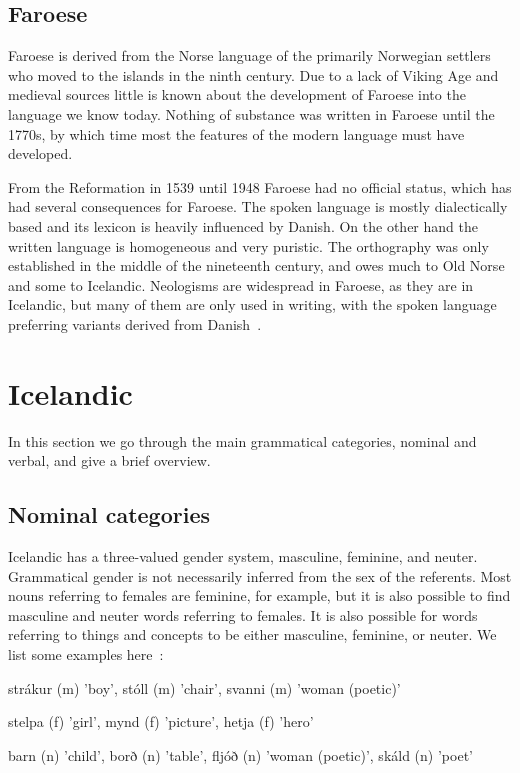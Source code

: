 \documentclass[12pt,%
    times,
]{lin-v2/lin}
\begin{document}
\subsection{Faroese}

Faroese is derived from the Norse language of the primarily Norwegian settlers
who moved to the islands in the ninth century. Due to a lack of Viking Age
and medieval sources little is known about the development of Faroese into
the language we know today. Nothing of substance was written in Faroese
until the 1770s, by which time most the features of the modern language
must have developed.

From the Reformation in 1539 until 1948 Faroese had no official status,
which has had several consequences for Faroese. The spoken language is
mostly dialectically based and its lexicon is heavily influenced by
Danish. On the other hand the written language is homogeneous and very
puristic. The orthography was only established in the middle of the nineteenth century,
and owes much to Old Norse and some to Icelandic. Neologisms are widespread
in Faroese, as they are in Icelandic, but many of them are only used in
writing, with the spoken language preferring variants derived from
Danish~\citep{germanicFaroese}.


\section{Icelandic}

In this section we go through the main grammatical categories, nominal and verbal,
and give a brief overview.

\subsection{Nominal categories}

Icelandic has a three-valued gender system, masculine, feminine, and neuter.
Grammatical gender is not necessarily inferred from the sex of the referents.
Most nouns referring to females are feminine, for example, but it is also possible to find
masculine and neuter words referring to females. It is also possible for
words referring to things and concepts to be either masculine, feminine, or neuter.
We list some examples here~\citep{icelandic}:
\begin{exe}
    \ex \begin{xlist}
        \item strákur (m) 'boy', stóll (m) 'chair', svanni (m) 'woman (poetic)'
        \item stelpa (f) 'girl', mynd (f) 'picture', hetja (f) 'hero'
        \item barn (n) 'child', borð (n) 'table', fljóð (n) 'woman (poetic)', skáld (n) 'poet'
    \end{xlist}
\end{exe}
\end{document}
